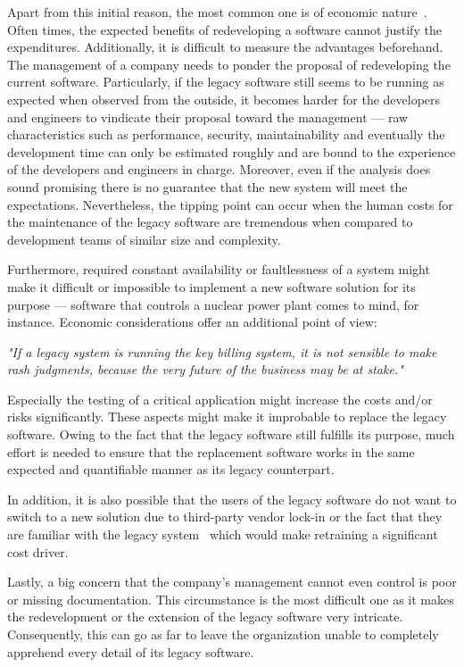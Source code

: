 \documentclass[12pt,a4paper,twoside]{report}
\begin{document}
Apart from this initial reason, the most common one is of economic nature~\cite{schneidewind-preserve-or-redesign}.
Often times, the expected benefits of redeveloping a software cannot justify the expenditures.
Additionally, it is difficult to measure the advantages beforehand. The management
of a company needs to ponder the proposal of redeveloping the current software.
Particularly, if the legacy software still seems to be running as expected when observed
from the outside, it becomes harder for the developers and engineers to vindicate
their proposal toward the management --- raw characteristics such as performance,
security, maintainability and eventually the development time can only be estimated
roughly and are bound to the experience of the developers and engineers in charge.
Moreover, even if the analysis does sound promising there is no guarantee that the new system
will meet the expectations. Nevertheless, the tipping point can occur when the human costs for the maintenance
of the legacy software are tremendous when compared to development teams of similar size and complexity.

Furthermore, required constant availability or faultlessness of a system might make it
difficult or impossible to implement a new software solution for its purpose ---
software that controls a nuclear power plant comes to mind, for instance.
Economic considerations offer an additional point of view:
\begin{displayquote}
\emph{"If a legacy system is running the key billing system, it is not sensible
to make rash judgments, because the very future of the business may be at stake."}~\cite{bennett-coping-legacy}
\end{displayquote}
Especially the testing of a critical application might increase the costs
and/or risks significantly. These aspects might make it improbable to replace
the legacy software. Owing to the fact that the legacy software still fulfills
its purpose, much effort is needed to ensure that the replacement software works
in the same expected and quantifiable manner as its legacy counterpart.

In addition, it is also possible that the users of the legacy software do not want
to switch to a new solution due to third-party vendor lock-in or the fact that
they are familiar with the legacy system~\cite{bennett-coping-legacy} which would make
retraining a significant cost driver.

Lastly, a big concern that the company's management cannot even control is
poor or missing documentation. This circumstance is the most difficult one
as it makes the redevelopment or the extension of the legacy software very intricate.
Consequently, this can go as far to leave the organization unable to completely apprehend
every detail of its legacy software.
\end{document}
